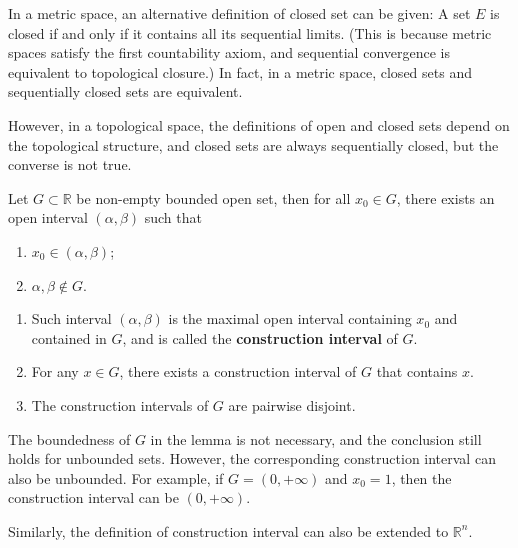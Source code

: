 \begin{note}
    In a metric space, an alternative definition of closed set can be given:
    A set \(E\) is closed if and only if it contains all its sequential limits.
    (This is because metric spaces satisfy the first countability axiom,
    and sequential convergence is equivalent to topological closure.)
    In fact, in a metric space, closed sets and sequentially closed sets are equivalent.
    
    However, in a topological space, the definitions of open and closed sets depend on the topological structure,
    and closed sets are always sequentially closed, but the converse is not true.
\end{note}

\vspace{0.7cm}
\begin{lemma}
    Let \(G \subset \mathbb{R}\) be non-empty bounded open set, 
    then for all \(x_{0} \in G\), there exists an open interval \((\alpha, \beta)\) such that
    \begin{enumerate}[label=(\roman*)]
        \item \(x_0 \in (\alpha, \beta)\);
        \item \(\alpha, \beta \not\in G\).
    \end{enumerate}
\end{lemma}

\begin{property}
    \begin{enumerate}
        \item Such interval \((\alpha, \beta)\) is the maximal open interval containing \(x_0\) and contained in \(G\),
            and is called the \textbf{construction interval} of \(G\).
        \item For any \(x\in G\), there exists a construction interval of \(G\) that contains \(x\).
        \item The construction intervals of \(G\) are pairwise disjoint.
    \end{enumerate}
\end{property}

\begin{note}
    The boundedness of \(G\) in the lemma is not necessary, and the conclusion still holds for unbounded sets.
    However, the corresponding construction interval can also be unbounded.
    For example, if \(G = (0, +\infty)\) and \(x_0 = 1\), then the construction interval can be \((0, +\infty)\).

    Similarly, the definition of construction interval can also be extended to \(\mathbb{R}^n\).
\end{note}

